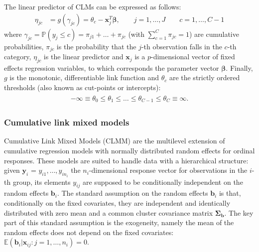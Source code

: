The linear predictor of CLMs can be expressed as follows:
\begin{equation}
    \label{clm}
    \begin{aligned}
        \eta_{jc} &= g(\gamma_{jc}) = \theta_{c} - \bm{x}_{j}^T \bm{\beta}, \qquad  j=1,\dots,J \qquad c=1,\dots,C-1
    \end{aligned}
\end{equation}
where \(\gamma_{jc} = \mathbb{P}(y_{j} \leq c) = \pi_{j1} + \dots + \pi_{jc}\) (with \(\sum_{c=1}^{C} \pi_{jc}=1\)) are cumulative probabilities, \(\pi_{jc}\) is the probability that the \(j\)-th observation falls in the \(c\)-th category, \(\eta_{jc}\) is the linear predictor
and \(\bm{x}_{j}\) is a \(p\)-dimensional vector of fixed effects regression variables, to which corresponds the parameter vector \(\bm{\beta}\).
Finally, \(g\) is the monotonic, differentiable link function and \(\theta_{c}\) are the strictly ordered thresholds (also known as cut-points or intercepts):
\begin{gather*}
    \begin{aligned}
        -\infty \equiv \theta_{0} \leq \theta_{1} \leq \dots \leq \theta_{C-1} \leq \theta_{C} \equiv \infty.
    \end{aligned}
\end{gather*}


\subsubsection{Cumulative link mixed models}
\label{sec:clmm}
Cumulative Link Mixed Models (CLMM) \cite{grilli2011multilevel,tutz1996random} are the multilevel extension of cumulative regression models with normally distributed random effects for ordinal responses. These models are suited to handle data with a hierarchical structure: given \(\bm{y}_{i}\) = \(y_{i1}, \dots, y_{in_{i}}\) the \(n_{i}\)-dimensional response vector for observations in the \(i\)-th group, its elements \(y_{ij}\) are supposed to be conditionally independent on the random effects \(\bm{b}_{i}\).
The standard assumption on the random effects \(\bm{b}_{i}\) is that, conditionally on the fixed covariates, they are independent and identically distributed with zero mean and a common cluster covariance matrix \(\bm{\Sigma_{b}}\).
The key part of this standard assumption is the exogeneity, namely the mean of the random effects does not depend on the fixed covariates: \(\mathbb{E}(\bm{b}_{i}|\bm{x}_{ij}:j=1,\dots,n_{i})=0\).

